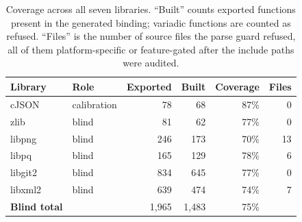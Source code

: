 \begin{table}[!t]
\caption{Coverage across all seven libraries. ``Built'' counts exported
functions present in the generated binding; variadic functions are counted as
refused. ``Files'' is the number of source files the parse guard refused, all
of them platform-specific or feature-gated after the include paths were
audited.}
\label{tab:coverage}
\centering\footnotesize
\begin{tabular}{llrrrr}
\toprule
\textbf{Library} & \textbf{Role} & \textbf{Exported} & \textbf{Built} &
\textbf{Coverage} & \textbf{Files} \\
\midrule
cJSON & calibration & 78 & 68 & 87\% & 0 \\
zlib & blind & 81 & 62 & 77\% & 0 \\
libpng & blind & 246 & 173 & 70\% & 13 \\
libpq & blind & 165 & 129 & 78\% & 6 \\
libgit2 & blind & 834 & 645 & 77\% & 0 \\
libxml2 & blind & 639 & 474 & 74\% & 7 \\
\midrule
\textbf{Blind total} & & 1,965 & 1,483 & 75\% & \\
\bottomrule
\end{tabular}
\end{table}
